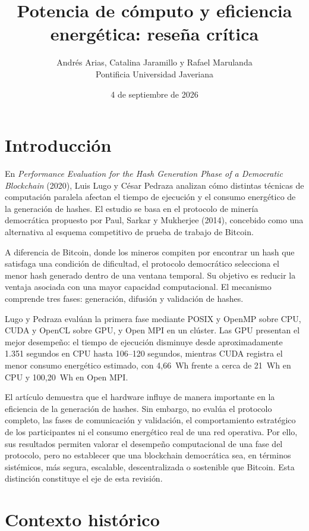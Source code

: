 \documentclass[spanish,11pt]{article}
\title{Potencia de cómputo y eficiencia energética: reseña crítica}
\author{Andrés Arias, Catalina Jaramillo y Rafael Marulanda\\
  {\small Pontificia Universidad Javeriana}}
\date{4 de septiembre de 2026}
\begin{document}
\maketitle

\section{Introducción}\label{introduccion}

En \emph{Performance Evaluation for the Hash Generation Phase of a Democratic Blockchain} (2020), Luis 
Lugo y César Pedraza analizan cómo distintas técnicas de computación 
paralela afectan el tiempo de ejecución y el consumo energético de la generación de hashes. 
El estudio se basa en el protocolo de minería democrática propuesto por Paul, Sarkar y Mukherjee (2014),
concebido como una alternativa al esquema competitivo de prueba de trabajo de Bitcoin.

A diferencia de Bitcoin, donde los mineros compiten por encontrar un hash que satisfaga una 
condición de dificultad, el protocolo democrático selecciona el menor hash generado dentro de 
una ventana temporal. Su objetivo es reducir la ventaja asociada con una mayor 
capacidad computacional. El mecanismo comprende tres fases: generación, difusión y validación de hashes. 

Lugo y Pedraza evalúan la primera fase mediante POSIX y OpenMP sobre CPU, 
CUDA y OpenCL sobre GPU, y Open MPI en un clúster. Las GPU presentan el mejor desempeño: 
el tiempo de ejecución disminuye desde aproximadamente 1.351 segundos en CPU hasta 106--120 segundos, 
mientras CUDA registra el menor consumo energético estimado, con 4,66~Wh frente a cerca de 21~Wh en 
CPU y 100,20~Wh en Open MPI. 

El artículo demuestra que el hardware influye de manera importante 
en la eficiencia de la generación de hashes. Sin embargo, no evalúa el protocolo 
completo, las fases de comunicación y validación, el comportamiento estratégico de los 
participantes ni el consumo energético real de una red operativa. 
Por ello, sus resultados permiten valorar el desempeño computacional de una fase del protocolo, 
pero no establecer que una blockchain democrática sea, en términos sistémicos, 
más segura, escalable, descentralizada o sostenible que Bitcoin. Esta distinción 
constituye el eje de esta revisión.

\section{Contexto histórico}\label{contexto-historico}
\end{document}
